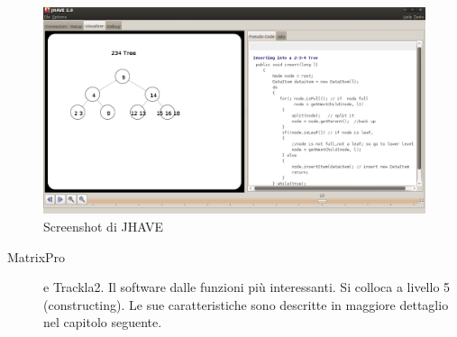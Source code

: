 \begin{figure}
\centering
\includegraphics[scale=0.25]{images/JHAVE_screenshot.png}
\caption{Screenshot di JHAVE}
\end{figure}
\begin{description}
\item [{{MatrixPro}}] e Trackla2. Il software dalle funzioni più interessanti.
Si colloca a livello 5 (constructing). Le sue caratteristiche sono
descritte in maggiore dettaglio nel capitolo seguente.
\end{description}

